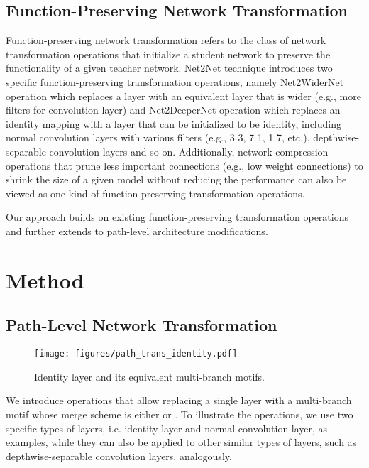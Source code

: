 \documentclass{article}
\begin{document}
\subsection{Function-Preserving Network Transformation}\label{para:net-trans}
Function-preserving network transformation refers to the class of network transformation operations that initialize a student network to preserve the functionality of a given teacher network. Net2Net technique \cite{chen2015net2net} introduces two specific function-preserving transformation operations, namely Net2WiderNet operation which replaces a layer with an equivalent layer that is wider (e.g., more filters for convolution layer) and Net2DeeperNet operation which replaces an identity mapping with a layer that can be initialized to be identity, including normal convolution layers with various filters (e.g., 3  3, 7  1, 1  7, etc.), depthwise-separable convolution layers \cite{chollet2016xception} and so on. Additionally, network compression operations \cite{han2015learning} that prune less important connections (e.g., low weight connections) to shrink the size of a given model without reducing the performance can also be viewed as one kind of function-preserving transformation operations. 

Our approach builds on existing function-preserving transformation operations and further extends to path-level architecture modifications. 

\section{Method}
\subsection{Path-Level Network Transformation}\label{sec:path_trans}
\begin{figure}[t]
	\centering
	\texttt{[image: figures/path\_trans\_identity.pdf]}
	\caption{Identity layer and its equivalent multi-branch motifs.}
	\label{fig:path_trans_identity}
\end{figure}

We introduce operations that allow replacing a single layer with a multi-branch motif whose merge scheme is either  or . To illustrate the operations, we use two specific types of layers, i.e. identity layer and normal convolution layer, as examples, while they can also be applied to other similar types of layers, such as depthwise-separable convolution layers, analogously. 
\end{document}
